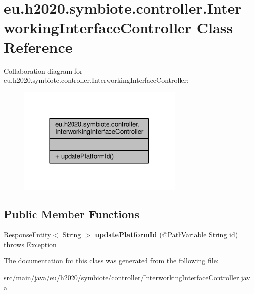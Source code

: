 \hypertarget{classeu_1_1h2020_1_1symbiote_1_1controller_1_1InterworkingInterfaceController}{}\section{eu.\+h2020.\+symbiote.\+controller.\+Interworking\+Interface\+Controller Class Reference}
\label{classeu_1_1h2020_1_1symbiote_1_1controller_1_1InterworkingInterfaceController}


Collaboration diagram for eu.\+h2020.\+symbiote.\+controller.\+Interworking\+Interface\+Controller\+:
\nopagebreak
\begin{figure}[H]
\begin{center}
\leavevmode
\includegraphics[width=230pt]{classeu_1_1h2020_1_1symbiote_1_1controller_1_1InterworkingInterfaceController__coll__graph}
\end{center}
\end{figure}
\subsection*{Public Member Functions}
\begin{DoxyCompactItemize}
\item 
\mbox{\label{classeu_1_1h2020_1_1symbiote_1_1controller_1_1InterworkingInterfaceController_a6ff9bf0ef30e7e2a34b2d89e77399a59}} 
Response\+Entity$<$ String $>$ {\bfseries update\+Platform\+Id} (@Path\+Variable String id)  throws Exception 
\end{DoxyCompactItemize}


The documentation for this class was generated from the following file\+:\begin{DoxyCompactItemize}
\item 
src/main/java/eu/h2020/symbiote/controller/Interworking\+Interface\+Controller.\+java\end{DoxyCompactItemize}
